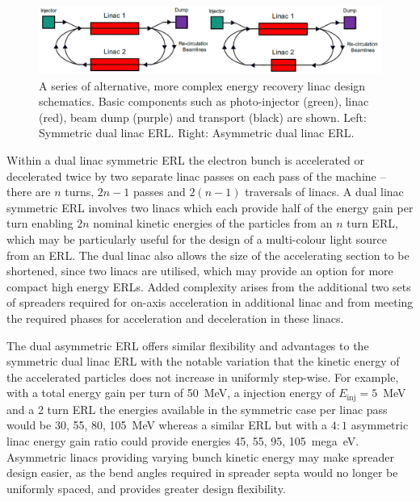 \documentclass[../main.tex]{subfiles}
\begin{document}
\begin{figure}[!h]
\centering
\includegraphics[width=\textwidth]{Figures/Energy_Recovery_Linac_Design/dual_linac_ERLs.pdf}
\caption{A series of alternative, more complex energy recovery linac design schematics. Basic components such as photo-injector (green), linac (red), beam dump (purple) and transport (black) are shown. Left: Symmetric dual linac ERL. Right: Asymmetric dual linac ERL.}
\label{fig:dual_linac_ERL_designs}
\end{figure}

Within a dual linac symmetric ERL the electron bunch is accelerated or decelerated twice by two separate linac passes on each pass of the machine -- there are $n$ turns, $2n-1$ passes and $2\left(n-1\right)$ traversals of linacs. A dual linac symmetric ERL involves two linacs which each provide half of the energy gain per turn enabling $2n$ nominal kinetic energies of the particles from an $n$ turn ERL, which may be particularly useful for the design of a multi-colour light source from an ERL. The dual linac also allows the size of the accelerating section to be shortened, since two linacs are utilised, which may provide an option for more compact high energy ERLs. Added complexity arises from the additional two sets of spreaders required for on-axis acceleration in additional linac and from meeting the required phases for acceleration and deceleration in these linacs. 

The dual asymmetric ERL offers similar flexibility and advantages to the symmetric dual linac ERL with the notable variation that the kinetic energy of the accelerated particles does not increase in uniformly step-wise. For example, with a total energy gain per turn of 50~\si{\mega\electronvolt}, a injection energy of $E_{\mathrm{inj}}=5$~\si{\mega\electronvolt} and a 2 turn ERL the energies available in the symmetric case per linac pass would be 30, 55, 80, 105~\si{\mega\electronvolt} whereas a similar ERL but with a $4:1$ asymmetric linac energy gain ratio could provide energies 45, 55, 95, 105~\si{mega\electronvolt}. Asymmetric linacs providing varying bunch kinetic energy may make spreader design easier, as the bend angles required in spreader septa would no longer be uniformly spaced, and provides greater design flexibility.
\end{document}
